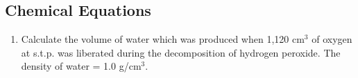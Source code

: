 \subsection{Chemical Equations}

\begin{enumerate}
	\item Calculate the volume of water which was produced when 1,120 cm$^3$ of oxygen at s.t.p. was liberated during the decomposition of hydrogen peroxide. The density of water = 1.0 g/cm$^3$.

\end{enumerate}














